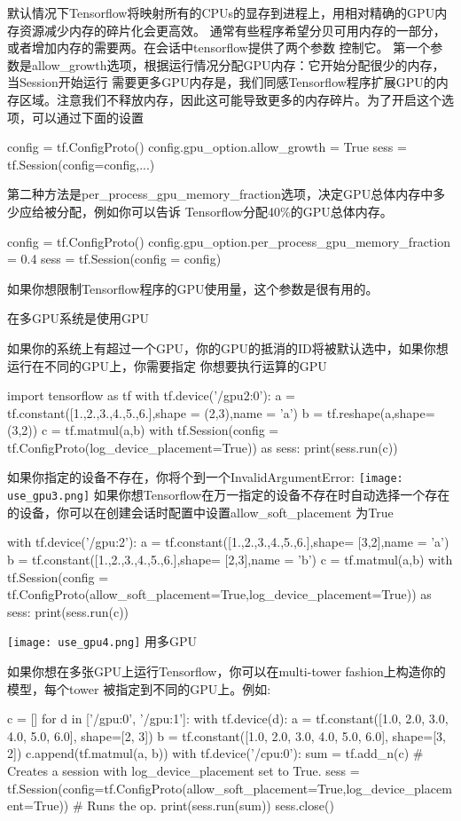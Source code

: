 默认情况下Tensorflow将映射所有的CPUs的显存到进程上，用相对精确的GPU内存资源减少内存的碎片化会更高效。 通常有些程序希望分贝可用内存的一部分，或者增加内存的需要两。在会话中tensorflow提供了两个参数 控制它。 第一个参数是allow\_growth选项，根据运行情况分配GPU内存：它开始分配很少的内存，当Session开始运行 需要更多GPU内存是，我们同感Tensorflow程序扩展GPU的内存区域。注意我们不释放内存，因此这可能导致更多的内存碎片。为了开启这个选项，可以通过下面的设置
\begin{python}
config = tf.ConfigProto()
config.gpu_option.allow_growth = True
sess = tf.Session(config=config,...)
\end{python}
第二种方法是per\_process\_gpu\_memory\_fraction选项，决定GPU总体内存中多少应给被分配，例如你可以告诉 Tensorflow分配40\%的GPU总体内存。
\begin{python}
config = tf.ConfigProto()
config.gpu_option.per_process_gpu_memory_fraction = 0.4
sess = tf.Session(config = config)
\end{python}
如果你想限制Tensorflow程序的GPU使用量，这个参数是很有用的。

在多GPU系统是使用GPU

如果你的系统上有超过一个GPU，你的GPU的抵消的ID将被默认选中，如果你想运行在不同的GPU上，你需要指定 你想要执行运算的GPU
\begin{python}
import tensorflow as tf
with tf.device('/gpu2:0'):
    a = tf.constant([1.,2.,3.,4.,5.,6.],shape = (2,3),name = 'a')
    b = tf.reshape(a,shape=(3,2))
    c = tf.matmul(a,b)
    with tf.Session(config = tf.ConfigProto(log_device_placement=True)) as sess:
        print(sess.run(c))
\end{python}
如果你指定的设备不存在，你将个到一个InvalidArgumentError:\newline
\texttt{[image: use\_gpu3.png]}\newline
如果你想Tensorflow在万一指定的设备不存在时自动选择一个存在的设备，你可以在创建会话时配置中设置allow\_soft\_placement 为True
\begin{python}
with tf.device('/gpu:2'):
  a = tf.constant([1.,2.,3.,4.,5.,6.],shape= [3,2],name = 'a')
  b = tf.constant([1.,2.,3.,4.,5.,6.],shape= [2,3],name = 'b')
  c = tf.matmul(a,b)
with tf.Session(config = tf.ConfigProto(allow_soft_placement=True,log_device_placement=True)) as sess:
    print(sess.run(c))
\end{python}
\texttt{[image: use\_gpu4.png]}\newline
用多GPU

如果你想在多张GPU上运行Tensorflow，你可以在multi-tower fashion上构造你的模型，每个tower 被指定到不同的GPU上。例如:
\begin{python}
c = []
for d in ['/gpu:0', '/gpu:1']:
    with tf.device(d):
        a = tf.constant([1.0, 2.0, 3.0, 4.0, 5.0, 6.0], shape=[2, 3])
        b = tf.constant([1.0, 2.0, 3.0, 4.0, 5.0, 6.0], shape=[3, 2])
        c.append(tf.matmul(a, b))
    with tf.device('/cpu:0'):
        sum = tf.add_n(c)
   # Creates a session with log_device_placement set to True.
sess = tf.Session(config=tf.ConfigProto(allow_soft_placement=True,log_device_placement=True))
  # Runs the op.
print(sess.run(sum))
sess.close()
\end{python}
